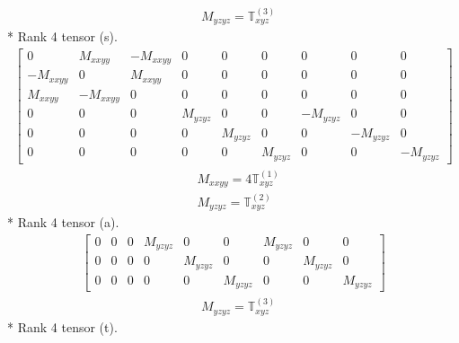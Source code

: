 \documentclass[fleqn,8pt,landscape]{jsarticle}
\begin{document}
\begin{align*}
& M_{yzyz} = \mathbb{T}_{xyz}^{(3)}
\end{align*}
* Rank 4 tensor (s).
\begin{align*}
\begin{bmatrix} 0 & M_{xxyy} & - M_{xxyy} & 0 & 0 & 0 & 0 & 0 & 0 \\ - M_{xxyy} & 0 & M_{xxyy} & 0 & 0 & 0 & 0 & 0 & 0 \\ M_{xxyy} & - M_{xxyy} & 0 & 0 & 0 & 0 & 0 & 0 & 0 \\ 0 & 0 & 0 & M_{yzyz} & 0 & 0 & - M_{yzyz} & 0 & 0 \\ 0 & 0 & 0 & 0 & M_{yzyz} & 0 & 0 & - M_{yzyz} & 0 \\ 0 & 0 & 0 & 0 & 0 & M_{yzyz} & 0 & 0 & - M_{yzyz} \end{bmatrix}
\end{align*}
\begin{align*}
& M_{xxyy} = 4 \mathbb{T}_{xyz}^{(1)} \\
& M_{yzyz} = \mathbb{T}_{xyz}^{(2)}
\end{align*}
* Rank 4 tensor (a).
\begin{align*}
\begin{bmatrix} 0 & 0 & 0 & M_{yzyz} & 0 & 0 & M_{yzyz} & 0 & 0 \\ 0 & 0 & 0 & 0 & M_{yzyz} & 0 & 0 & M_{yzyz} & 0 \\ 0 & 0 & 0 & 0 & 0 & M_{yzyz} & 0 & 0 & M_{yzyz} \end{bmatrix}
\end{align*}
\begin{align*}
& M_{yzyz} = \mathbb{T}_{xyz}^{(3)}
\end{align*}
* Rank 4 tensor (t).
\end{document}
